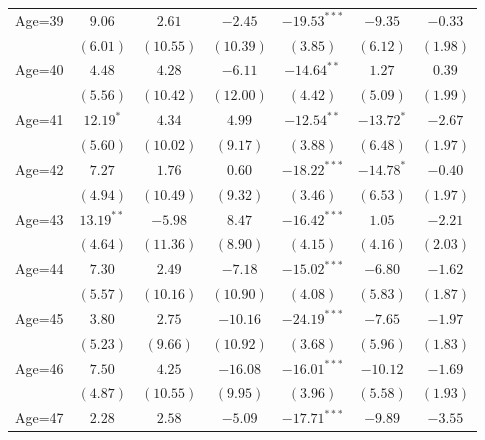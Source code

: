 \documentclass[fullpage]{paper}
\begin{document}
\begin{center}
\begin{longtable}{l c c c c c c }
Age=39      & $9.06$        & $2.61$        & $-2.45$       & $-19.53^{***}$ & $-9.35$        & $-0.33$       \\
            & $(6.01)$      & $(10.55)$     & $(10.39)$     & $(3.85)$       & $(6.12)$       & $(1.98)$      \\
Age=40      & $4.48$        & $4.28$        & $-6.11$       & $-14.64^{**}$  & $1.27$         & $0.39$        \\
            & $(5.56)$      & $(10.42)$     & $(12.00)$     & $(4.42)$       & $(5.09)$       & $(1.99)$      \\
Age=41      & $12.19^{*}$   & $4.34$        & $4.99$        & $-12.54^{**}$  & $-13.72^{*}$   & $-2.67$       \\
            & $(5.60)$      & $(10.02)$     & $(9.17)$      & $(3.88)$       & $(6.48)$       & $(1.97)$      \\
Age=42      & $7.27$        & $1.76$        & $0.60$        & $-18.22^{***}$ & $-14.78^{*}$   & $-0.40$       \\
            & $(4.94)$      & $(10.49)$     & $(9.32)$      & $(3.46)$       & $(6.53)$       & $(1.97)$      \\
Age=43      & $13.19^{**}$  & $-5.98$       & $8.47$        & $-16.42^{***}$ & $1.05$         & $-2.21$       \\
            & $(4.64)$      & $(11.36)$     & $(8.90)$      & $(4.15)$       & $(4.16)$       & $(2.03)$      \\
Age=44      & $7.30$        & $2.49$        & $-7.18$       & $-15.02^{***}$ & $-6.80$        & $-1.62$       \\
            & $(5.57)$      & $(10.16)$     & $(10.90)$     & $(4.08)$       & $(5.83)$       & $(1.87)$      \\
Age=45      & $3.80$        & $2.75$        & $-10.16$      & $-24.19^{***}$ & $-7.65$        & $-1.97$       \\
            & $(5.23)$      & $(9.66)$      & $(10.92)$     & $(3.68)$       & $(5.96)$       & $(1.83)$      \\
Age=46      & $7.50$        & $4.25$        & $-16.08$      & $-16.01^{***}$ & $-10.12$       & $-1.69$       \\
            & $(4.87)$      & $(10.55)$     & $(9.95)$      & $(3.96)$       & $(5.58)$       & $(1.93)$      \\
Age=47      & $2.28$        & $2.58$        & $-5.09$       & $-17.71^{***}$ & $-9.89$        & $-3.55$       \\

\end{longtable}
\end{center}
\end{document}
